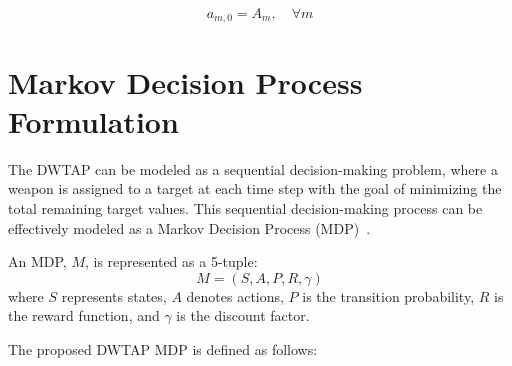 \documentclass{ieeeaccess}
\begin{document}
\begin{equation}\label{eq:initial_ammunition}
    a_{m,0} = A_m, \quad \forall m
\end{equation}

\section{Markov Decision Process Formulation}
\label{sec:mdp}

The DWTAP can be modeled as a sequential decision-making problem, where a weapon is assigned to a target at each time step with the goal of minimizing the total remaining target values. This sequential decision-making process can be effectively modeled as a Markov Decision Process (MDP)~\cite{bellman1957dynamic}.

An MDP, $M$, is represented as a 5-tuple:
\begin{equation}
M = (S, A, P, R, \gamma)
\end{equation}
where $S$ represents states, $A$ denotes actions, $P$ is the transition probability, $R$ is the reward function, and $\gamma$ is the discount factor.

The proposed DWTAP MDP is defined as follows:
\end{document}
